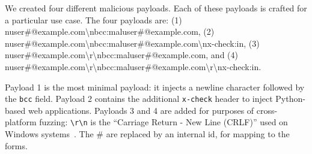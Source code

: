 We created four different malicious payloads. Each of these payloads
is crafted for a particular use case. The four payloads are:
(1) nuser\#@example.com\textbackslash{}n\-bcc:\-maluser\-\#\-@example.com,
(2) nuser\#@\-example.com\textbackslash{}n\-bcc:\-maluser\-\#\-@example.com\textbackslash{}n\-x-check:in,
(3) nuser\#@\-example.com\textbackslash{}r\textbackslash{}n\-bcc:\-maluser\#\-@example.com,
and (4) nuser\#\-@example.com\-\textbackslash{}r\textbackslash{}n\-bcc:\-maluser\#\-@example.\-com\textbackslash{}r\textbackslash{}n\-x-check:in.
	
Payload 1 is the most minimal payload: it injects a newline character followed by the \texttt{bcc} field. Payload 2 contains the additional \texttt{x-check} header to inject Python-based web applications. Payloads 3 and 4 are added for purposes of cross-platform fuzzing: \texttt{\textbackslash{}r\textbackslash{}n} is the ``Carriage Return - New Line (CRLF)'' used on Windows systems~\cite{rfc2616}. The \# are replaced by an internal id, for mapping to the forms.




